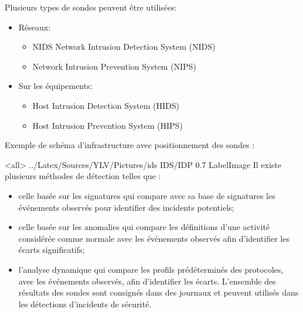 Plusieurs types de sondes peuvent être utilisées:
\begin{itemize}
\item Réseaux:
\begin{itemize}
\item NIDS Network Intrusion Detection System (NIDS)
\item Network Intrusion Prevention System (NIPS)
\end{itemize}
\item Sur les équipements:
\begin{itemize}
\item Host Intrusion Detection System (HIDS)
\item Host Intrusion Prevention System (HIPS)
\end{itemize}
\end{itemize}
Exemple de schéma d'infrastructure avec positionnement des sondes :

\mode<all>{\picframe
{../Latex/Sources/YLV/Pictures/ids}%
{IDS/IDP} %
{0.7} %
{LabelImage} %
}
Il existe plusieurs méthodes de détection telles que :
\begin{itemize}
\item celle basée sur les signatures qui compare avec sa base de signatures les événements observés pour identifier des incidents potentiels;
\item celle basée sur les anomalies qui compare les définitions d'une activité considérée comme normale avec les événements observés afin d'identifier les écarts significatifs;
\item l'analyse dynamique qui compare les profils prédéterminés des protocoles, avec les événements observés, afin d'identifier les écarts.
L'ensemble des résultats des sondes sont consignés dans des journaux et peuvent utilisés dans les détections d'incidents de sécurité. 
\end{itemize}


